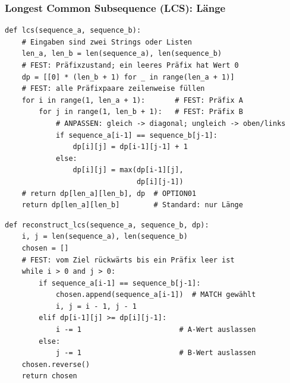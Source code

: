 \begin{contentbox}[Musterkarte]
\begin{factlist}
\end{factlist}
\end{contentbox}

\subsubsection{Longest Common Subsequence (LCS): Länge}\label{sec:03-lcs}

\begin{codebox}
\begin{lstlisting}[style=CodeExpert]
def lcs(sequence_a, sequence_b):
    # Eingaben sind zwei Strings oder Listen
    len_a, len_b = len(sequence_a), len(sequence_b)
    # FEST: Präfixzustand; ein leeres Präfix hat Wert 0
    dp = [[0] * (len_b + 1) for _ in range(len_a + 1)]
    # FEST: alle Präfixpaare zeilenweise füllen
    for i in range(1, len_a + 1):       # FEST: Präfix A
        for j in range(1, len_b + 1):   # FEST: Präfix B
            # ANPASSEN: gleich -> diagonal; ungleich -> oben/links
            if sequence_a[i-1] == sequence_b[j-1]:
                dp[i][j] = dp[i-1][j-1] + 1
            else:
                dp[i][j] = max(dp[i-1][j],
                               dp[i][j-1])
    # return dp[len_a][len_b], dp  # OPTION01
    return dp[len_a][len_b]        # Standard: nur Länge
\end{lstlisting}
\end{codebox}

\begin{codebox}
\begin{lstlisting}[style=CodeExpert]
def reconstruct_lcs(sequence_a, sequence_b, dp):
    i, j = len(sequence_a), len(sequence_b)
    chosen = []
    # FEST: vom Ziel rückwärts bis ein Präfix leer ist
    while i > 0 and j > 0:
        if sequence_a[i-1] == sequence_b[j-1]:
            chosen.append(sequence_a[i-1])  # MATCH gewählt
            i, j = i - 1, j - 1
        elif dp[i-1][j] >= dp[i][j-1]:
            i -= 1                       # A-Wert auslassen
        else:
            j -= 1                       # B-Wert auslassen
    chosen.reverse()
    return chosen
\end{lstlisting}
\end{codebox}

